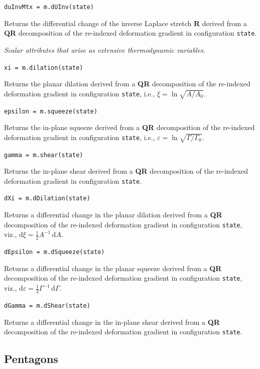 \medskip\noindent
\texttt{duInvMtx = m.dUInv(state)}

\medskip\noindent
Returns the differential change of the inverse Laplace stretch \textbf{R} derived from a \textbf{QR} decomposition of the re-indexed deformation gradient in configuration \texttt{state}.

\medskip\noindent
\textit{Scalar attributes that arise as extensive thermodynamic variables.}

\medskip\noindent
\texttt{xi = m.dilation(state)}

\medskip\noindent
Returns the planar dilation derived from a \textbf{QR} decomposition of the re-indexed deformation gradient in configuration \texttt{state}, i.e., $\xi = \ln \sqrt{A / \! A_0}$.

\newpage
\medskip\noindent
\texttt{epsilon = m.squeeze(state)}

\medskip\noindent
Returns the in-plane squeeze derived from a \textbf{QR} decomposition of the re-indexed deformation gradient in configuration \texttt{state}, i.e., $\varepsilon = \ln \sqrt{ \Gamma \! / \Gamma_0}$.

\medskip\noindent
\texttt{gamma = m.shear(state)}

\medskip\noindent
Returns the in-plane shear derived from a \textbf{QR} decomposition of the re-indexed deformation gradient in configuration \texttt{state}.

\medskip\noindent
\texttt{dXi = m.dDilation(state)}

\medskip\noindent
Returns a differential change in the planar dilation derived from a \textbf{QR} decomposition of the re-indexed deformation gradient in configuration \texttt{state}, viz., $\mathrm{d}\xi = \tfrac{1}{2} A^{-1} \, \mathrm{d}A$.

\medskip\noindent
\texttt{dEpsilon = m.dSqueeze(state)}

\medskip\noindent
Returns a differential change in the planar squeeze derived from a \textbf{QR} decomposition of the re-indexed deformation gradient in configuration \texttt{state}, viz., $\mathrm{d} \varepsilon = \tfrac{1}{2} \Gamma^{-1} \, \mathrm{d} \Gamma$.

\medskip\noindent
\texttt{dGamma = m.dShear(state)}

\medskip\noindent
Returns a differential change in the in-plane shear derived from a \textbf{QR} decomposition of the re-indexed deformation gradient in configuration \texttt{state}.

\subsection{Pentagons}

